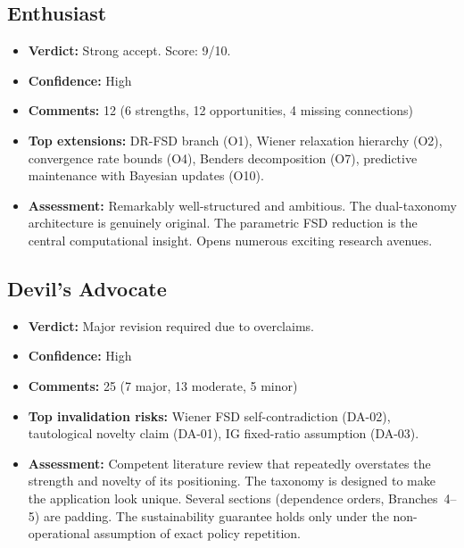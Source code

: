 \documentclass[11pt,a4paper]{article}
\begin{document}
\subsection{Enthusiast}
\begin{itemize}[nosep,leftmargin=1.5em]
  \item \textbf{Verdict:} Strong accept. Score: 9/10.
  \item \textbf{Confidence:} High
  \item \textbf{Comments:} 12 (6 strengths, 12 opportunities, 4 missing connections)
  \item \textbf{Top extensions:} DR-FSD branch (O1), Wiener relaxation hierarchy (O2), convergence rate bounds (O4), Benders decomposition (O7), predictive maintenance with Bayesian updates (O10).
  \item \textbf{Assessment:} Remarkably well-structured and ambitious. The dual-taxonomy architecture is genuinely original. The parametric FSD reduction is the central computational insight. Opens numerous exciting research avenues.
\end{itemize}

\subsection{Devil's Advocate}
\begin{itemize}[nosep,leftmargin=1.5em]
  \item \textbf{Verdict:} Major revision required due to overclaims.
  \item \textbf{Confidence:} High
  \item \textbf{Comments:} 25 (7 major, 13 moderate, 5 minor)
  \item \textbf{Top invalidation risks:} Wiener FSD self-contradiction (DA-02), tautological novelty claim (DA-01), IG fixed-ratio assumption (DA-03).
  \item \textbf{Assessment:} Competent literature review that repeatedly overstates the strength and novelty of its positioning. The taxonomy is designed to make the application look unique. Several sections (dependence orders, Branches~4--5) are padding. The sustainability guarantee holds only under the non-operational assumption of exact policy repetition.
\end{itemize}
\end{document}
